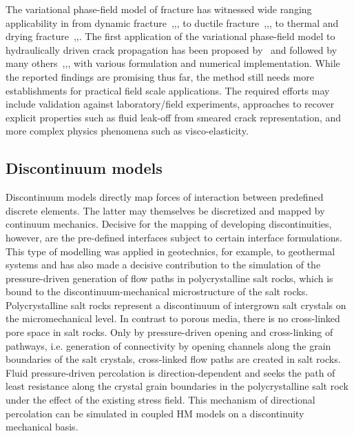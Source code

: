 The variational phase-field model of fracture has witnessed wide ranging applicability in from dynamic fracture~\cite{Bourdin2011},\cite{Borden2012},\cite{Li2016}, to ductile fracture~\cite{Ambati2015},\cite{Miehe2015486},\cite{Alessi2017}, to thermal and drying fracture~\cite{Maurini2013},\cite{Bourdin2014},\cite{Miehe2015_thermo}. 
The first application of the variational phase-field model to hydraulically driven crack propagation has been proposed by~\cite{Bourdin2012} and followed by many others~\cite{Wheeler2014},\cite{Wilson2016},\cite{Heider201738},\cite{Santillan2017} with various formulation and numerical implementation. 
While the reported findings are promising thus far, the method still needs more establishments for practical field scale applications. 
The required efforts may include validation against laboratory/field experiments, approaches to recover explicit properties such as fluid leak-off from smeared crack representation, and more complex physics phenomena such as visco-elasticity.

\subsection{Discontinuum models}

Discontinuum models directly map forces of interaction between predefined discrete elements. The latter may themselves be discretized and mapped by continuum mechanics. Decisive for the mapping of developing discontinuities, however, are the pre-defined interfaces subject to certain interface formulations. This type of modelling was applied in geotechnics, for example, to geothermal systems \cite{Zeeb2015264} and has also made a decisive contribution to the simulation of the pressure-driven generation of flow paths in polycrystalline salt rocks, which is bound to the discontinuum-mechanical microstructure of the salt rocks. Polycrystalline salt rocks represent a discontinuum of intergrown salt crystals on the micromechanical level. In contrast to porous media, there is no cross-linked pore space in salt rocks. Only by pressure-driven opening and cross-linking of pathways, i.e. generation of connectivity by opening channels along the grain boundaries of the salt crystals, cross-linked flow paths are created in salt rocks. Fluid pressure-driven percolation is direction-dependent and seeks the path of least resistance along the crystal grain boundaries in the polycrystalline salt rock under the effect of the existing stress field. This mechanism of directional percolation can be simulated in coupled HM models on a discontinuity mechanical basis.

